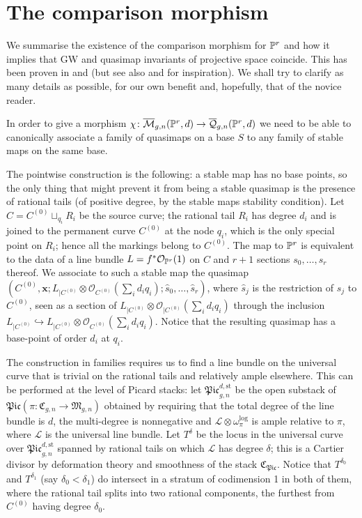 \section{The comparison morphism}

We summarise the existence of the comparison morphism for $\mathbb P^r$ and how it implies that GW and quasimap invariants of projective space coincide. This has been proven in \cite[Theorem 3]{MOP} and \cite[Section 4.3]{Manolache-Push} (but see also \cite[Proposition 4.1]{Bertram} and \cite[Theorem 7.1]{Popa-Roth} for inspiration). We shall try to clarify as many details as possible, for our own benefit and, hopefully, that of the novice reader.

In order to give a morphism $\chi\colon\overline{\mathcal M}_{g,n}(\mathbb P^r,d)\rightarrow\overline{\mathcal Q}_{g,n}(\mathbb P^r,d)$ we need to be able to canonically associate a family of quasimaps on a base $S$ to any family of stable maps on the same base.

The pointwise construction is the following: a stable map has no base points, so the only thing that might prevent it from being a stable quasimap is the presence of rational tails (of positive degree, by the stable maps stability condition). Let $C=C^{(0)}\sqcup_{q_i}R_i$ be the source curve; the rational tail $R_i$ has degree $d_i$ and is joined to the permanent curve $C^{(0)}$ at the node $q_i$, which is the only special point on $R_i$; hence all the markings belong to $C^{(0)}$. The map to $\mathbb P^r$ is equivalent to the data of a line bundle $L=f^*\mathcal O_{\mathbb P^r}(1)$ on $C$ and $r+1$ sections $s_0,\ldots,s_r$ thereof. We associate to such a stable map the quasimap $(C^{(0)},\mathbf x; L_{|C^{(0)}}\otimes\mathcal O_{C^{(0)}}(\sum_{i}d_iq_i);\hat s_0,\ldots,\hat s_r)$, where $\hat s_j$ is the restriction of $s_j$ to $C^{(0)}$, seen as a section of $L_{|C^{(0)}}\otimes\mathcal O_{|C^{(0)}}(\sum_{i}d_iq_i)$ through the inclusion $L_{|C^{(0)}}\hookrightarrow L_{|C^{(0)}}\otimes\mathcal O_{C^{(0)}}(\sum_{i}d_iq_i)$. Notice that the resulting quasimap has a base-point of order $d_i$ at $q_i$.

The construction in families requires us to find a line bundle on the universal curve that is trivial on the rational tails and relatively ample elsewhere. This can be performed at the level of Picard stacks: let $\mathfrak{Pic}_{g,n}^{d,\text{st}}$ be the open substack of $\mathfrak{Pic}(\pi\colon\mathfrak{C}_{g,n}\to\mathfrak{M}_{g,n})$ obtained by requiring that the total degree of the line bundle is $d$, the multi-degree is nonnegative and $\mathcal L\otimes\omega_{\pi}^{\text{log}}$ is ample relative to $\pi$, where $\mathcal L$ is the universal line bundle. Let $T^{\delta}$ be the locus in the universal curve over $\mathfrak{Pic}_{g,n}^{d,\text{st}}$ spanned by rational tails on which $\mathcal L$ has degree $\delta$; this is a Cartier divisor by deformation theory and smoothness of the stack $\mathfrak{C}_{\mathfrak{Pic}}$. Notice that $T^{\delta_0}$ and $T^{\delta_1}$ (say $\delta_0<\delta_1$) do intersect in a stratum of codimension 1 in both of them, where the rational tail splits into two rational components, the furthest from $C^{(0)}$ having degree $\delta_0$.

